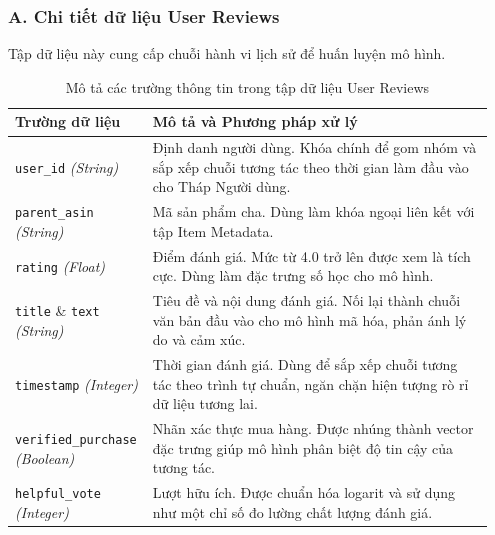 \subsubsection*{A. Chi tiết dữ liệu User Reviews}
Tập dữ liệu này cung cấp chuỗi hành vi lịch sử để huấn luyện mô hình.

\begin{table}[H]
    \centering
    \caption{Mô tả các trường thông tin trong tập dữ liệu User Reviews}
    \label{tab:user_reviews_desc}
    \renewcommand{\arraystretch}{1.3}
    \begin{tabular}{|p{0.25\linewidth}|p{0.7\linewidth}|}
        \hline
        \textbf{Trường dữ liệu} & \textbf{Mô tả và Phương pháp xử lý} \\
        \hline
        \texttt{user\_id} \newline \textit{(String)} & 
        Định danh người dùng. Khóa chính để gom nhóm và sắp xếp chuỗi tương tác theo thời gian làm đầu vào cho Tháp Người dùng. \\
        \hline
        \texttt{parent\_asin} \newline \textit{(String)} & 
        Mã sản phẩm cha. Dùng làm khóa ngoại liên kết với tập Item Metadata. \\
        \hline
        \texttt{rating} \newline \textit{(Float)} & 
        Điểm đánh giá. Mức từ 4.0 trở lên được xem là tích cực. Dùng làm đặc trưng số học cho mô hình. \\
        \hline
        \texttt{title} \& \texttt{text} \newline \textit{(String)} & 
        Tiêu đề và nội dung đánh giá. Nối lại thành chuỗi văn bản đầu vào cho mô hình mã hóa, phản ánh lý do và cảm xúc. \\
        \hline
        \texttt{timestamp} \newline \textit{(Integer)} & 
        Thời gian đánh giá. Dùng để sắp xếp chuỗi tương tác theo trình tự chuẩn, ngăn chặn hiện tượng rò rỉ dữ liệu tương lai. \\
        \hline
        \texttt{verified\_purchase} \newline \textit{(Boolean)} & 
        Nhãn xác thực mua hàng. Được nhúng thành vector đặc trưng giúp mô hình phân biệt độ tin cậy của tương tác. \\
        \hline
        \texttt{helpful\_vote} \newline \textit{(Integer)} & 
        Lượt hữu ích. Được chuẩn hóa logarit và sử dụng như một chỉ số đo lường chất lượng đánh giá. \\
        \hline
    \end{tabular}
\end{table}

